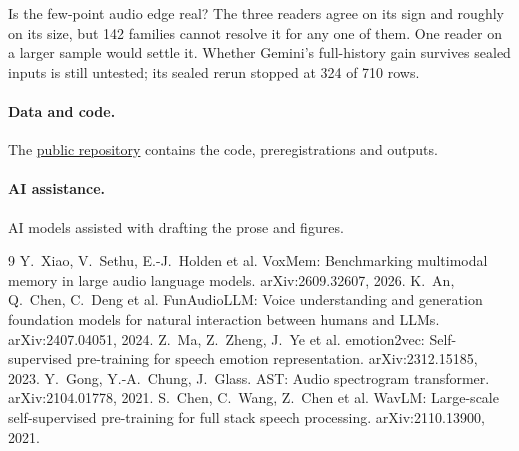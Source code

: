 \documentclass[11pt]{article}
\begin{document}
Is the few-point audio edge real? The three readers agree on its sign and roughly on its size, but 142
families cannot resolve it for any one of them. One reader on a larger sample would settle it.
Whether Gemini's full-history gain survives sealed inputs is still untested; its sealed rerun stopped at
324 of 710 rows.

\paragraph{Data and code.} The \href{https://github.com/SeverinVisionary/voxmem-audio-vs-text-memory}{public repository}
contains the code, preregistrations and outputs.

\paragraph{AI assistance.} AI models assisted with drafting the prose and figures.

\begin{thebibliography}{9}
 Y.~Xiao, V.~Sethu, E.-J.~Holden et al. VoxMem: Benchmarking multimodal memory in large audio
language models. arXiv:2609.32607, 2026.
 K.~An, Q.~Chen, C.~Deng et al. FunAudioLLM: Voice understanding and generation foundation
models for natural interaction between humans and LLMs. arXiv:2407.04051, 2024.
 Z.~Ma, Z.~Zheng, J.~Ye et al. emotion2vec: Self-supervised pre-training for speech
emotion representation. arXiv:2312.15185, 2023.
 Y.~Gong, Y.-A.~Chung, J.~Glass. AST: Audio spectrogram transformer. arXiv:2104.01778, 2021.
 S.~Chen, C.~Wang, Z.~Chen et al. WavLM: Large-scale self-supervised pre-training for full stack
speech processing. arXiv:2110.13900, 2021.
\end{thebibliography}
\end{document}
